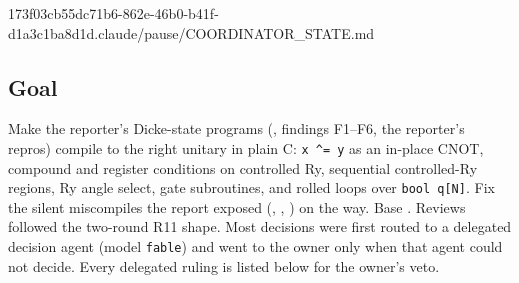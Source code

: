 %
  {173f03cb}{55dc71b6-862e-46b0-b41f-d1a3c1ba8d1d}{.claude/pause/COORDINATOR\_STATE.md}
\begingroup\sloppy

\subsection*{Goal}
Make the reporter's Dicke-state programs (, findings F1--F6, the reporter's repros) compile to the right unitary in plain C: \texttt{x \textasciicircum= y} as an in-place CNOT, compound and register conditions on controlled Ry, sequential controlled-Ry regions, Ry angle select, gate subroutines, and rolled loops over \texttt{bool q[N]}. Fix the silent miscompiles the report exposed (, , ) on the way. Base . Reviews followed the two-round R11 shape. Most decisions were first routed to a delegated decision agent (model \texttt{fable}) and went to the owner only when that agent could not decide. Every delegated ruling is listed below for the owner's veto.

